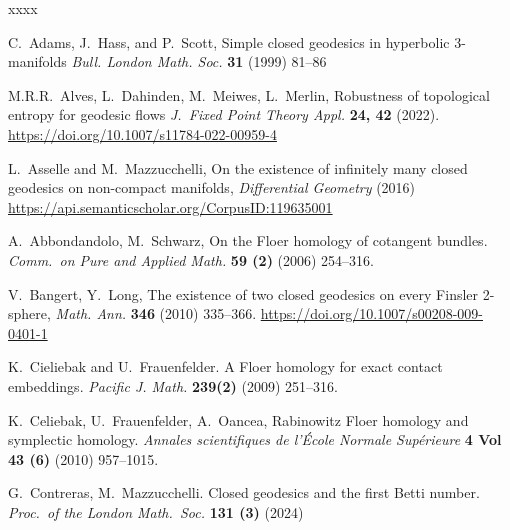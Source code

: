 \documentclass{amsart}
\theoremstyle{definition}
\theoremstyle{remark}
\numberwithin{equation}{section}
\begin{document}
\begin{thebibliography}{xxxx}


    C.\ Adams, J.\ Hass, and P.\ Scott, {Simple closed geodesics in hyperbolic 3-manifolds}
    \emph{Bull. London Math. Soc.} \textbf{31} (1999) 81--86

    M.R.R.\ Alves, L.\ Dahinden, M.\ Meiwes, L.\ Merlin, {Robustness of topological entropy for geodesic flows} \emph{J.\ Fixed Point Theory Appl.} \textbf{24, 42} (2022). \url{https://doi.org/10.1007/s11784-022-00959-4}

    {L.\ Asselle and M.\ Mazzucchelli},
    {On the existence of infinitely many closed geodesics on non-compact manifolds},
    \emph{Differential Geometry} (2016) \url{https://api.semanticscholar.org/CorpusID:119635001}

    

    A.\ Abbondandolo, M.\ Schwarz,
    {On the Floer homology of cotangent bundles.}
    \emph{Comm.\ on Pure and Applied Math.} \textbf{59 (2)} (2006) 254--316.

    V.\ Bangert, Y.\ Long, 
    {The existence of two closed geodesics on every Finsler 2-sphere,} 
    \emph{Math. Ann.} \textbf{346}  (2010) 335--366. \url{https://doi.org/10.1007/s00208-009-0401-1}


    K.\ Cieliebak and U.\ Frauenfelder. 
    {A Floer homology for exact contact embeddings.}
    \emph{Pacific J. Math.} \textbf{239(2)} (2009) 251--316.

    K.\ Celiebak, U.\ Frauenfelder, A.\ Oancea,  
    Rabinowitz Floer homology and symplectic homology.
    \emph{Annales scientifiques de l'École Normale Supérieure} \textbf{4 Vol 43 (6)} (2010) 957--1015.
    

    G.\ Contreras, M.\ Mazzucchelli. 
    {Closed geodesics and the first Betti number. }
    \emph{Proc.\ of the London Math.\ Soc.} \textbf{131 (3)} (2024)



\end{thebibliography}
\end{document}
